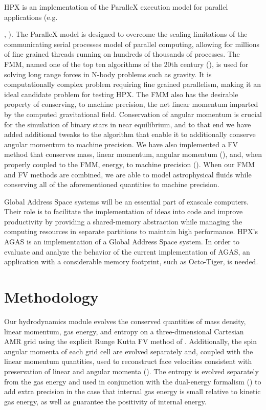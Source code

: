 \documentclass[preprint]{aastex}
\begin{document}
HPX is an implementation of the ParalleX execution model for parallel applications (e.g. {\cite{DABKAS2012}, \cite{B2012}). 
The ParalleX model is designed to overcome the scaling limitations of the communicating serial processes model of parallel computing, allowing for millions of fine grained threads running on 
hundreds of thousands of processes. The FMM, named one of the top ten algorithms of the 20th century (\cite{TOP10}),  is used for solving long range forces in N-body problems such as gravity. It is computationally complex problem 
requiring fine grained parallelism, making it an ideal candidate problem for testing HPX. The FMM also has the desirable property of conserving, to machine precision, the net linear momentum
imparted by the computed gravitational field. Conservation of angular momentum is crucial for the simulation of binary stars in near equilibrium, and to that end we have added additional tweaks to the 
algorithm that enable it to additionally conserve angular momentum to machine precision. We have also implemented a 
FV method that conserves mass, linear momentum, angular momentum (\cite{D2015}), and, when properly coupled to the FMM, energy, to machine precision (\cite{MT2012}). When our FMM and FV methods are combined, we are able to model 
astrophysical fluids while conserving all of the aforementioned quantities to machine precision.


Global Address Space systems will be an essential part of exascale computers.
 Their role is to facilitate the implementation of ideas into code and improve productivity by providing a 
shared-memory abstraction while managing the computing resources in separate partitions to maintain high performance.
HPX’s AGAS is an implementation of a Global Address Space system. In order to evaluate and analyze the behavior of the current implementation of
 AGAS, an application with a considerable memory footprint, such as Octo-Tiger, is needed.

\section{Methodology}

Our hydrodynamics module evolves the conserved quantities of mass density, linear momentum, gas energy, and entropy on a three-dimensional Cartesian AMR grid using the explicit Runge Kutta FV method
of \cite{KT2000}. Additionally, the spin angular momenta of each 
grid cell are evolved separately and, coupled with the linear momentum quantities, 
used to reconstruct face velocities consistent with preservation of linear and angular momenta (\cite{D2015}). The entropy
is evolved separately from the gas energy and used in conjunction with the dual-energy formalism (\cite{BNSO1995}) to add extra precision in the case that internal gas energy is small relative to kinetic 
gas energy, as well as guarantee the positivity of internal energy.

}
\end{document}

